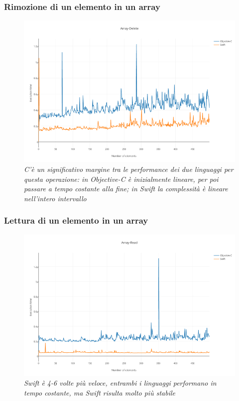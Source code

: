 \subsubsection{Rimozione di un elemento in un array}
\begin{figure}[H]
      \centering
      \includegraphics[scale=0.50]{immagini/array_delete.png}
            \vspace{0.8cm}
            \caption{\textit{C'è un significativo margine tra le performance dei due linguaggi per questa operazione: in Objective-C è inizialmente lineare, per poi passare a tempo costante alla fine; in Swift la complessità è lineare nell'intero intervallo}}
\end{figure}
\subsubsection{Lettura di un elemento in un array}
\begin{figure}[H]
      \centering
      \includegraphics[scale=0.50]{immagini/array_read.png}
            \vspace{0.8cm}
            \caption{\textit{Swift è 4-6 volte più veloce, entrambi i linguaggi performano in tempo costante, ma Swift risulta molto più stabile}}
\end{figure}
